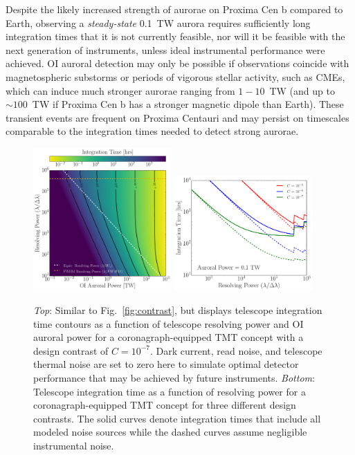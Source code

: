 \documentclass{emulateapj}
\begin{document}
Despite the likely increased strength of aurorae on Proxima Cen b compared to Earth, observing a {\em steady-state} 0.1~TW aurora requires sufficiently long integration times that it is not currently feasible, nor will it be feasible with the next generation of instruments, unless ideal instrumental performance were achieved. OI auroral detection may only be possible if observations coincide with magnetospheric substorms or periods of vigorous stellar activity, such as CMEs, which can induce much stronger aurorae ranging from $1 - 10$~TW (and up to ${\sim} 100$~TW if Proxima Cen b has a stronger magnetic dipole than Earth). These transient events are frequent on Proxima Centauri \citep{Davenport2016} and may persist on timescales comparable to the integration times needed to detect strong aurorae.

\begin{figure}
\centering
\includegraphics[width=0.47\textwidth]{exptime_B_inline_TMTC-7_noInstrumental.pdf}
\includegraphics[width=0.47\textwidth]{steadystate_contrast.pdf}
\caption{\textit{Top}: Similar to Fig.~\ref{fig:contrast}, but displays telescope integration time contours as a function of telescope resolving power and OI auroral power for a coronagraph-equipped TMT concept with a design contrast of $C = 10^{-7}$. Dark current, read noise, and telescope thermal noise are set to zero here to simulate optimal detector performance that may be achieved by future instruments. \textit{Bottom}: Telescope integration time as a function of resolving power for a coronagraph-equipped TMT concept for three different design contrasts.  The solid curves denote integration times that include all modeled noise sources while the dashed curves assume negligible instrumental noise.}
\label{fig:TMTC}
\end{figure}
\end{document}
